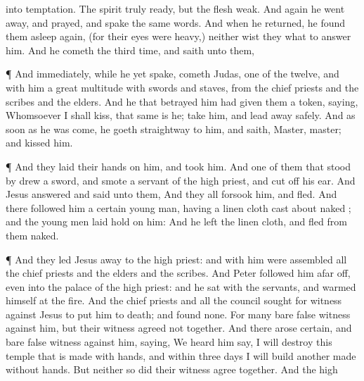 {{{into
temptation.
The spirit
truly
{}
ready,
but
the flesh
{}
weak.}}
And
again he went
away, and
prayed, and
spake the
same
words.
And when he
returned, he
found
them
asleep
again, (for
their
eyes
were
heavy,)
neither wist
they
what to
answer
him.
And he
cometh the third
time,
and
saith unto
them,
{}
\par }{\PP {}¶
And
immediately, while
he
yet
spake,
cometh
Judas,
one of the
twelve,
and
with
him a
great
multitude
with
swords
and
staves,
from the chief
priests
and the
scribes
and the
elders.
And he
that
betrayed
him had
given
them a
token,
saying,
Whomsoever I shall
kiss, that
same is
he;
take
him,
and
lead
{}
away
safely.
And as soon as he was
come, he
goeth
straightway to
him, and
saith,
Master,
master;
and
kissed
him.
\par }{\PP {}¶
And they
laid
their
hands
on
him,
and
took
him.
And
one of them
that stood
by
drew a
sword, and
smote a
servant of the high
priest,
and cut
off
his
ear.
And
Jesus
answered and
said unto
them,
{}
And
they
all
forsook
him, and
fled.
And there
followed
him a
certain young
man,
having a linen
cloth
cast
about
{}
naked
{};
and the young
men laid
hold on
him:
And he
left the linen
cloth, and
fled
from
them
naked.
\par }{\PP {}¶
And they
led
Jesus
away
to the high
priest:
and with
him were
assembled
all the chief
priests
and the
elders
and the
scribes.
And
Peter
followed
him afar
off,
even
into the
palace of the high
priest:
and he
sat
with the
servants,
and warmed
himself
at the
fire.
And the chief
priests
and
all the
council sought
for
witness
against
Jesus to
put
him
to
death;
and
found
none.
For
many bare false
witness
against
him,
but their
witness
agreed
not
together.
And there
arose
certain, and bare false
witness
against
him,
saying,
We
heard
him
say,
I will
destroy
this
temple
that is made with
hands,
and
within
three
days I will
build
another made without
hands.
But
neither
so
did
their
witness
agree
together.
And the high
}
